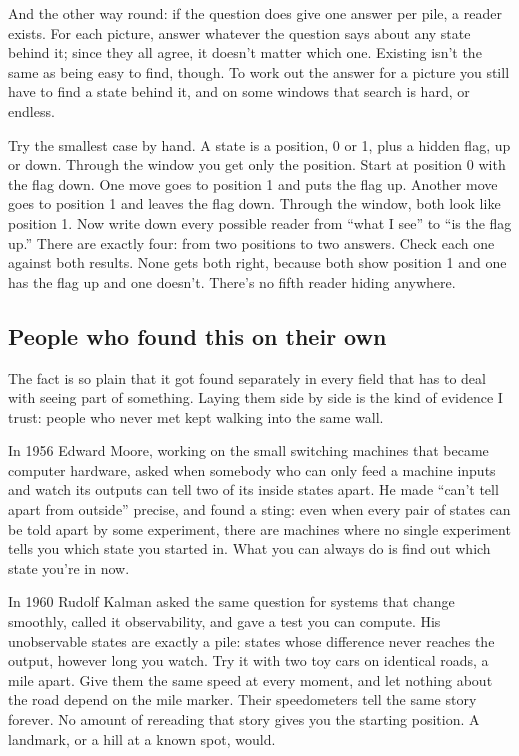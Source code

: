 \documentclass[11pt,twoside]{article}
\theoremstyle{thielethm}
\theoremstyle{thieledef}
\theoremstyle{thieledef}
\theoremstyle{thieledef}
\theoremstyle{thielethm}
\theoremstyle{thieleobs}
\theoremstyle{thielethm}
\begin{document}
And the other way round: if the question does give one answer per pile, a reader exists. For each picture, answer whatever the question says about any state behind it; since they all agree, it doesn't matter which one. Existing isn't the same as being easy to find, though. To work out the answer for a picture you still have to find a state behind it, and on some windows that search is hard, or endless.

Try the smallest case by hand. A state is a position, 0 or 1, plus a hidden flag, up or down. Through the window you get only the position. Start at position 0 with the flag down. One move goes to position 1 and puts the flag up. Another move goes to position 1 and leaves the flag down. Through the window, both look like position 1. Now write down every possible reader from ``what I see'' to ``is the flag up.'' There are exactly four: from two positions to two answers. Check each one against both results. None gets both right, because both show position 1 and one has the flag up and one doesn't. There's no fifth reader hiding anywhere.

\subsection{People who found this on their own}

The fact is so plain that it got found separately in every field that has to deal with seeing part of something. Laying them side by side is the kind of evidence I trust: people who never met kept walking into the same wall.

In 1956 Edward Moore, working on the small switching machines that became computer hardware, asked when somebody who can only feed a machine inputs and watch its outputs can tell two of its inside states apart. He made ``can't tell apart from outside'' precise, and found a sting: even when every pair of states can be told apart by some experiment, there are machines where no single experiment tells you which state you started in. What you can always do is find out which state you're in now.

In 1960 Rudolf Kalman asked the same question for systems that change smoothly, called it observability, and gave a test you can compute. His unobservable states are exactly a pile: states whose difference never reaches the output, however long you watch. Try it with two toy cars on identical roads, a mile apart. Give them the same speed at every moment, and let nothing about the road depend on the mile marker. Their speedometers tell the same story forever. No amount of rereading that story gives you the starting position. A landmark, or a hill at a known spot, would.
\end{document}
